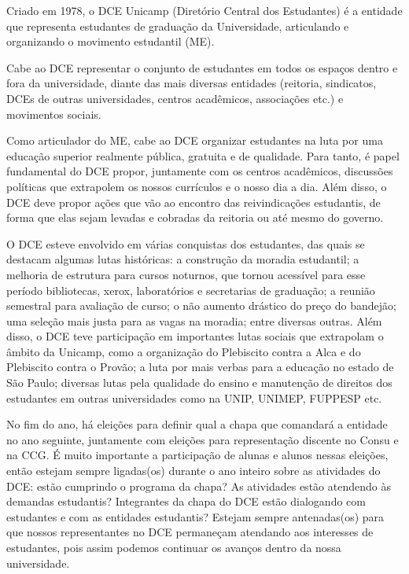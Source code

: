 Criado em 1978, o DCE Unicamp (Diretório Central dos Estudantes) é a entidade
que representa estudantes de graduação da Universidade, articulando e
organizando o movimento estudantil (ME).

Cabe ao DCE representar o conjunto de estudantes em todos os espaços dentro e
fora da universidade, diante das mais diversas entidades (reitoria, sindicatos,
DCEs de outras universidades, centros acadêmicos, associações etc.) e
movimentos sociais.

Como articulador do ME, cabe ao DCE organizar estudantes na luta por uma
educação superior realmente pública, gratuita e de qualidade. Para tanto, é
papel fundamental do DCE propor, juntamente com os centros acadêmicos,
discussões políticas que extrapolem os nossos currículos e o nosso dia a dia.
Além disso, o DCE deve propor ações que vão ao encontro das reivindicações
estudantis, de forma que elas sejam levadas e cobradas da reitoria ou até mesmo
do governo.

O DCE esteve envolvido em várias conquistas dos estudantes, das quais se
destacam algumas lutas históricas: a construção da moradia estudantil; a
melhoria de estrutura para cursos noturnos, que tornou acessível para esse
período bibliotecas, xerox, laboratórios e secretarias de graduação; a reunião
semestral para avaliação de curso; o não aumento drástico do preço do bandejão;
uma seleção mais justa para as vagas na moradia; entre diversas outras. Além
disso, o DCE teve participação em importantes lutas sociais que extrapolam o
âmbito da Unicamp, como a organização do Plebiscito contra a Alca e do
Plebiscito contra o Provão; a luta por mais verbas para a educação no estado de
São Paulo; diversas lutas pela qualidade do ensino e manutenção de direitos dos
estudantes em outras universidades como na UNIP, UNIMEP, FUPPESP etc.

No fim do ano, há eleições para definir qual a chapa que comandará a entidade
no ano seguinte, juntamente com eleições para representação discente no Consu e
na CCG. É muito importante a participação de alunas e alunos nessas eleições,
então estejam sempre ligadas(os) durante o ano inteiro sobre as atividades do
DCE: estão cumprindo o programa da chapa? As atividades estão atendendo às
demandas estudantis? Integrantes da chapa do DCE estão dialogando com
estudantes e com as entidades estudantis? Estejam sempre antenadas(os) para que
nossos representantes no DCE permaneçam atendando aos interesses de estudantes,
pois assim podemos continuar os avanços dentro da nossa universidade.

